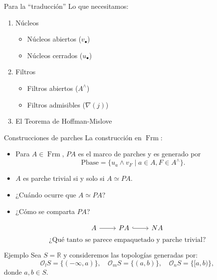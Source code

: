 \documentclass[compress,12pt]{beamer}
\DeclareMathOperator{\Frm}{Frm}
\begin{document}
\begin{frame}{Para la ``traducción''}
Lo que necesitamos:
\begin{enumerate}
\item<2-> Núcleos
\begin{itemize}
	\item<3-> Núcleos abiertos ($v_\bullet$)
	\item<4-> Núcleos cerrados ($u_\bullet$)
\end{itemize}
\item<5-> Filtros 
\begin{itemize}
	\item<6-> Filtros abiertos ($A^\wedge$)
	\item<7-> Filtros admisibles ($\nabla(j)$)
\end{itemize}
\item<8-> El Teorema de Hoffman-Mislove
\end{enumerate}
\end{frame}

\begin{frame}[fragile]{Construcciones de parches}
	La construcción en $\Frm$:
	\begin{itemize}
		\item<2-> Para $A\in \Frm$, $PA$ es el marco de parches y es generado por 
		\[
		\mbox{Pbase}=\{u_a\wedge v_F\mid a\in A, F\in A^\wedge\}.
		\]
		\item<3-> $A$ es parche trivial si y solo si $A\simeq PA$.
		\item<4-> ¿Cuándo ocurre que $A\simeq PA$?
		\item<5-> ¿Cómo se comparta $PA$?
	\end{itemize}
	\[\begin{tikzcd}
	{A} & {PA} & {NA}
	\arrow[from=1-1, to=1-2]
	\arrow[hook, from=1-2, to=1-3]
\end{tikzcd}\]
\[
\mbox{¿Qué tanto se parece empaquetado y parche trivial?}
\]
\end{frame}

\begin{frame}[fragile]{Ejemplo}
Sea $S=\mathbb{R}$ y consideremos las topologías generadas por:
\[
\mathcal{O}_lS=\{(-\infty, a)\},\quad  \mathcal{O}_mS=\{(a,b)\}, \quad \mathcal{O}_nS=\{[a,b)\},
\]
donde $a,b\in S$. 
\end{frame}
\end{document}
